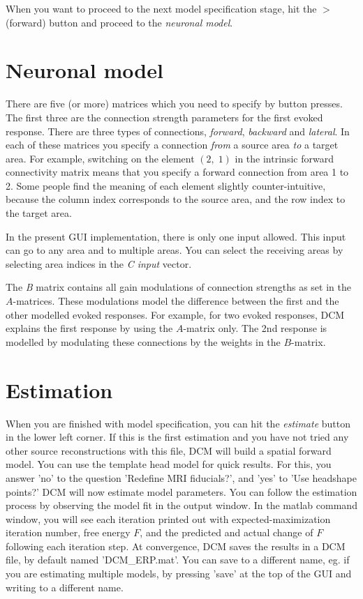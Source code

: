When you want to proceed to the next model
specification stage, hit the $>$ (forward) button and proceed
to the \textit{neuronal model}.

\section{Neuronal model}
There are five (or more) matrices which you need to specify by button presses. The
first three are the connection strength parameters for the first
evoked response. There are three types of connections,
\textit{forward}, \textit{backward} and \textit{lateral}. In each of
these matrices you specify a connection \textit{from} a source area
\textit{to} a target area. For example, switching on the element
$(2,\;1)$ in the intrinsic forward connectivity matrix means that you
specify a forward connection from area 1 to 2. Some people find the
meaning of each element slightly counter-intuitive, because the
column index corresponds to the source area, and the row index to the
target area.

In the present GUI implementation, there is only one input
allowed. This input can go to any area and to multiple areas. You can select
the receiving areas by selecting area indices in the \textit{C input} vector.

The \textit{B} matrix contains all gain modulations of connection
strengths as set in the $A$-matrices. These modulations model the
difference between the first and the other modelled evoked
responses. For example, for two evoked responses, DCM explains the
first response by using the $A$-matrix only. The 2nd response is
modelled by modulating these connections by the weights in
the $B$-matrix.

\section{Estimation}
When you are finished with model specification, you can hit the
\textit{estimate} button in the lower left corner. If this is the
first estimation and you have not tried any other source
reconstructions with this file, DCM will build a spatial forward
model. You can use the template head model for quick results. For
this, you answer 'no' to the question 'Redefine MRI fiducials?', and
'yes' to 'Use headshape points?' DCM will now
estimate model parameters. You can follow the estimation process by
observing the model fit in the output window. In the matlab command
window, you will see each iteration printed out with
expected-maximization iteration number, free energy $F$, and the
predicted and actual change of $F$ following each iteration
step. At convergence, DCM saves the results in a DCM file, by default
named 'DCM\_ERP.mat'. You can save to a different name, eg. if you are estimating multiple models, by pressing 'save' at
the top of the GUI and writing to a different name.

